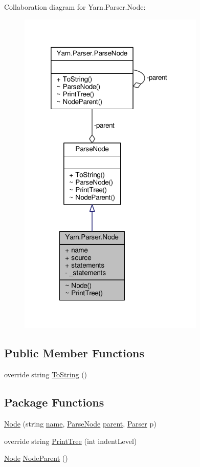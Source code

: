Collaboration diagram for Yarn.\-Parser.\-Node\-:
\nopagebreak
\begin{figure}[H]
\begin{center}
\leavevmode
\includegraphics[width=251pt]{a00273}
\end{center}
\end{figure}
\subsection*{Public Member Functions}
\begin{DoxyCompactItemize}
\item 
override string \hyperlink{a00063_a18c67cb16090d0889bb9d6c8c6c565f8}{To\-String} ()
\end{DoxyCompactItemize}
\subsection*{Package Functions}
\begin{DoxyCompactItemize}
\item 
\hyperlink{a00054_ae0562dc06ca747307b66039ef2f28772}{Node} (string \hyperlink{a00054_a3cfa07840da3a7a92c820788e902aefb}{name}, \hyperlink{a00063}{Parse\-Node} \hyperlink{a00063_af313a82103fcc2ff5a177dbb06b92f7b}{parent}, \hyperlink{a00064}{Parser} p)
\item 
override string \hyperlink{a00054_ab11501ebf251fdaa7cfe44edfa993068}{Print\-Tree} (int indent\-Level)
\item 
\hyperlink{a00054}{Node} \hyperlink{a00063_a580e520a29444fc23ac3660cbe514a09}{Node\-Parent} ()
\end{DoxyCompactItemize}
